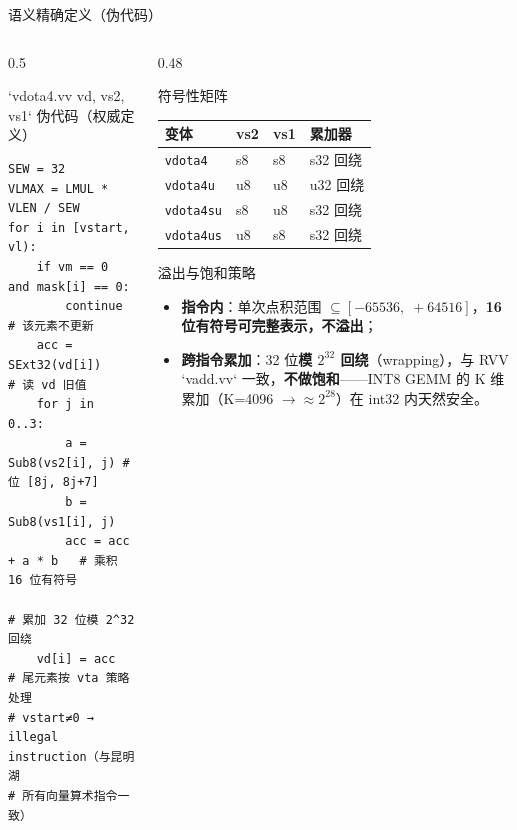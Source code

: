 \documentclass[aspectratio=169]{beamer}
\newcommand{\smalltable}[1]{\par\centering\scriptsize #1\par}
\begin{document}
\begin{frame}[fragile]{语义精确定义（伪代码）}
\begin{columns}[T]
\begin{column}{0.5\textwidth}
\begin{block}{`vdota4.vv vd, vs2, vs1` 伪代码（权威定义）}
\scriptsize
\begin{verbatim}
SEW = 32
VLMAX = LMUL * VLEN / SEW
for i in [vstart, vl):
    if vm == 0 and mask[i] == 0:
        continue            # 该元素不更新
    acc = SExt32(vd[i])     # 读 vd 旧值
    for j in 0..3:
        a = Sub8(vs2[i], j) # 位 [8j, 8j+7]
        b = Sub8(vs1[i], j)
        acc = acc + a * b   # 乘积 16 位有符号
                            # 累加 32 位模 2^32 回绕
    vd[i] = acc
# 尾元素按 vta 策略处理
# vstart≠0 → illegal instruction（与昆明湖
# 所有向量算术指令一致）
\end{verbatim}
\end{block}
\end{column}
\begin{column}{0.48\textwidth}
\begin{block}{符号性矩阵}
\smalltable{%
\begin{tabular}{@{}llll@{}}
\toprule
变体 & vs2 & vs1 & 累加器 \\
\midrule
\texttt{vdota4} & s8 & s8 & s32 回绕 \\
\texttt{vdota4u} & u8 & u8 & u32 回绕 \\
\texttt{vdota4su} & s8 & u8 & s32 回绕 \\
\texttt{vdota4us} & u8 & s8 & s32 回绕 \\
\bottomrule
\end{tabular}}
\end{block}
\begin{block}{溢出与饱和策略}
\begin{itemize}\footnotesize
  \item \textbf{指令内}：单次点积范围 $\subseteq [-65536,\;+64516]$，\textbf{16 位有符号可完整表示，不溢出}；
  \item \textbf{跨指令累加}：32 位\textbf{模 $2^{32}$ 回绕}（wrapping），与 RVV `vadd.vv` 一致，\textbf{不做饱和}——INT8 GEMM 的 K 维累加（K=4096 $\to \approx 2^{28}$）在 int32 内天然安全。
\end{itemize}
\end{block}
\end{column}
\end{columns}
\end{frame}
\end{document}
